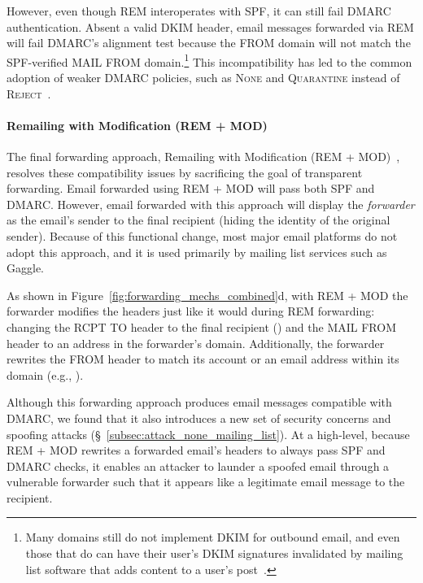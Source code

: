 However, even though REM interoperates with SPF, it can still fail DMARC
authentication.  Absent a valid DKIM header, email messages forwarded
via REM will fail DMARC's alignment test because the \textsc{FROM}
domain will not match the SPF-verified \textsc{MAIL FROM}
domain.\footnote{Many domains still do not implement DKIM for outbound email, and even
  those that do can have their user's DKIM signatures invalidated by mailing
  list software that adds content to a user's post~\cite{rfc6783}.}
This incompatibility has led to the common adoption of weaker DMARC policies,
such as \textsc{None} and \textsc{Quarantine} instead of
\textsc{Reject}~\cite{hutowardsunderstanding}.


\paragraph{Remailing with Modification (REM + MOD)}
The final forwarding approach, Remailing with Modification (REM + MOD)~\cite{rfc6783},
resolves these compatibility issues by sacrificing the goal of transparent forwarding.
Email forwarded using REM + MOD will pass both SPF and DMARC.
However, email forwarded with this approach will display the \textit{forwarder} as the email's sender to the final recipient (hiding the identity of the original sender).
Because of this functional change, most major email platforms do not adopt this approach, and it is used primarily by mailing list services such as Gaggle.

As shown in Figure~\ref{fig:forwarding_mechs_combined}d, with REM + MOD the forwarder modifies the headers just like it would during REM forwarding: changing the \textsc{RCPT TO} header to the final recipient () and the \textsc{MAIL FROM} header to an address in the forwarder's domain.
Additionally, the forwarder rewrites the \textsc{FROM} header to match its account or an email address within its domain (e.g., ).

Although this forwarding approach produces email messages compatible with DMARC,
we found that it also introduces a new set of security concerns and spoofing attacks (\S~\ref{subsec:attack_none_mailing_list}).
At a high-level, because REM + MOD rewrites a forwarded email's headers to always pass SPF and DMARC checks, it enables an attacker to launder a spoofed email through a vulnerable forwarder such that it appears like a legitimate email message to the recipient.

